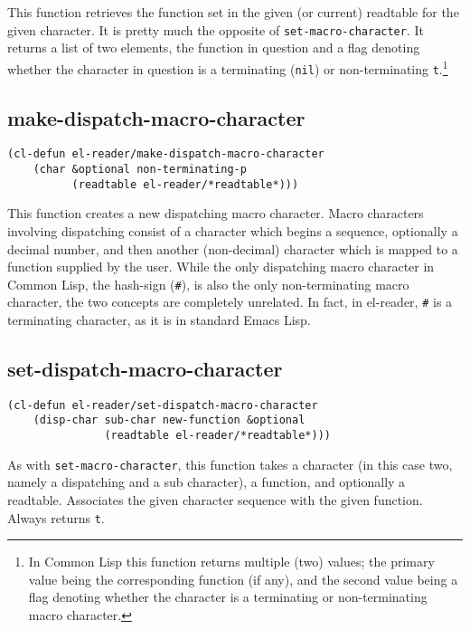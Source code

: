 \documentclass[a4paper,10pt,twoside]{report}
\newcommand{\el}{Emacs Lisp}
\newcommand{\cl}{Common Lisp}
\newcommand{\elr}{el-reader}
\newcommand{\sym}[1]{\texttt{#1}}
\newcommand{\fun}[1]{\texttt{#1}}
\newcommand{\nil}{\sym{nil}}
\newcommand{\tee}{\sym{t}}
\begin{document}
This function retrieves the function set in the given (or current) readtable for
the given character.  It is pretty much the opposite of
\fun{set-macro-character}.  It returns a list of two elements, the function in
question and a flag denoting whether the character in question is a terminating
(\nil{}) or non-terminating \tee{}.\footnote{In \cl{} this function returns
  multiple (two) values; the primary value being the corresponding function (if
  any), and the second value being a flag denoting whether the character is a
  terminating or non-terminating macro character.}

\subsection{make-dispatch-macro-character}
\label{subsec:make-dispatch-macro-character}

\begin{lstlisting}[style=lispinline]
(cl-defun el-reader/make-dispatch-macro-character
    (char &optional non-terminating-p
          (readtable el-reader/*readtable*)))
\end{lstlisting}

This function creates a new dispatching macro character.  Macro characters
involving dispatching consist of a character which begins a sequence, optionally
a decimal number, and then another (non-decimal) character which is mapped to a
function supplied by the user.  While the only dispatching macro character in
\cl{}, the hash-sign (\texttt{\#}), is also the only non-terminating macro
character, the two concepts are completely unrelated.  In fact, in \elr{},
\texttt{\#} is a terminating character, as it is in standard \el{}.

\subsection{set-dispatch-macro-character}
\label{subsec:set-dispatch-macro-character}

\begin{lstlisting}[style=lispinline]
(cl-defun el-reader/set-dispatch-macro-character
    (disp-char sub-char new-function &optional
               (readtable el-reader/*readtable*)))
\end{lstlisting}

As with \fun{set-macro-character}, this function takes a character (in this case
two, namely a dispatching and a sub character), a function, and optionally a
readtable.  Associates the given character sequence with the given function.
Always returns \tee{}.
\end{document}
